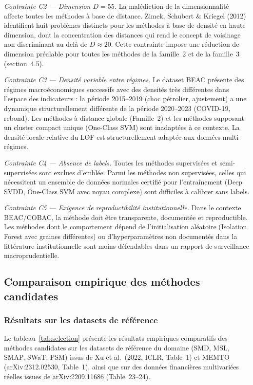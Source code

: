 \documentclass[12pt,a4paper]{article}
\begin{document}
\textit{Contrainte C2 --- Dimension $D = 55$.} La malédiction de la
dimensionnalité affecte toutes les méthodes à base de distance. Zimek,
Schubert \& Kriegel (2012) identifient huit problèmes distincts pour les
méthodes à base de densité en haute dimension, dont la concentration des
distances qui rend le concept de voisinage non discriminant au-delà de
$D \approx 20$. Cette contrainte impose une réduction de dimension préalable
pour toutes les méthodes de la famille~2 et de la famille~3 (section~4.5).

\textit{Contrainte C3 --- Densité variable entre régimes.} Le dataset BEAC
présente des régimes macroéconomiques successifs avec des densités très
différentes dans l'espace des indicateurs : la période 2015--2019 (choc
pétrolier, ajustement) a une dynamique structurellement différente de la
période 2020--2023 (COVID-19, rebond). Les méthodes à distance globale
(Famille~2) et les méthodes supposant un cluster compact unique (One-Class
SVM) sont inadaptées à ce contexte. La densité locale relative du LOF est
structurellement adaptée aux données multi-régimes.

\textit{Contrainte C4 --- Absence de labels.} Toutes les méthodes supervisées
et semi-supervisées sont exclues d'emblée. Parmi les méthodes non supervisées,
celles qui nécessitent un ensemble de données normales certifié pour
l'entraînement (Deep SVDD, One-Class SVM avec noyau complexe) sont
difficiles à calibrer sans labels.

\textit{Contrainte C5 --- Exigence de reproductibilité institutionnelle.} Dans
le contexte BEAC/COBAC, la méthode doit être transparente, documentée et
reproductible. Les méthodes dont le comportement dépend de l'initialisation
aléatoire (Isolation Forest avec graines différentes) ou d'hyperparamètres
non documentés dans la littérature institutionnelle sont moins défendables
dans un rapport de surveillance macroprudentielle.

\subsection{Comparaison empirique des méthodes candidates}

\subsubsection{Résultats sur les datasets de référence}

Le tableau~\ref{tab:selection} présente les résultats empiriques comparatifs
des méthodes candidates sur les datasets de référence du domaine (SMD, MSL,
SMAP, SWaT, PSM) issus de Xu et al.\ (2022, ICLR, Table~1) et MEMTO
(arXiv:2312.02530, Table~1), ainsi que sur des données financières multivariées
réelles issues de arXiv:2209.11686 (Table~23--24).
\end{document}
